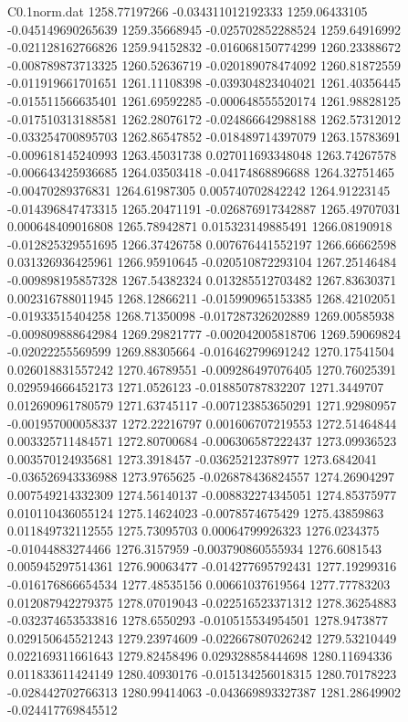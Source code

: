 \begin{filecontents}{C0.1norm.dat}
1258.77197266		-0.034311012192333
1259.06433105		-0.045149690265639
1259.35668945		-0.025702852288524
1259.64916992		-0.021128162766826
1259.94152832		-0.016068150774299
1260.23388672		-0.008789873713325
1260.52636719		-0.020189078474092
1260.81872559		-0.011919661701651
1261.11108398		-0.039304823404021
1261.40356445		-0.015511566635401
1261.69592285		-0.000648555520174
1261.98828125		-0.017510313188581
1262.28076172		-0.024866642988188
1262.57312012		-0.033254700895703
1262.86547852		-0.018489714397079
1263.15783691		-0.009618145240993
1263.45031738		0.027011693348048
1263.74267578		-0.006643425936685
1264.03503418		-0.04174868896688
1264.32751465		-0.00470289376831
1264.61987305		0.005740702842242
1264.91223145		-0.014396847473315
1265.20471191		-0.026876917342887
1265.49707031		0.000648409016808
1265.78942871		0.015323149885491
1266.08190918		-0.012825329551695
1266.37426758		0.007676441552197
1266.66662598		0.031326936425961
1266.95910645		-0.020510872293104
1267.25146484		-0.009898195857328
1267.54382324		0.013285512703482
1267.83630371		0.002316788011945
1268.12866211		-0.015990965153385
1268.42102051		-0.01933515404258
1268.71350098		-0.017287326202889
1269.00585938		-0.009809888642984
1269.29821777		-0.002042005818706
1269.59069824		-0.02022255569599
1269.88305664		-0.016462799691242
1270.17541504		0.026018831557242
1270.46789551		-0.009286497076405
1270.76025391		0.029594666452173
1271.0526123		-0.018850787832207
1271.3449707		0.012690961780579
1271.63745117		-0.007123853650291
1271.92980957		-0.001957000058337
1272.22216797		0.001606707219553
1272.51464844		0.003325711484571
1272.80700684		-0.006306587222437
1273.09936523		0.003570124935681
1273.3918457		-0.03625212378977
1273.6842041		-0.036526943336988
1273.9765625		-0.026878436824557
1274.26904297		0.007549214332309
1274.56140137		-0.008832274345051
1274.85375977		0.010110436055124
1275.14624023		-0.0078574675429
1275.43859863		0.011849732112555
1275.73095703		0.00064799926323
1276.0234375		-0.01044883274466
1276.3157959		-0.003790860555934
1276.6081543		0.005945297514361
1276.90063477		-0.014277695792431
1277.19299316		-0.016176866654534
1277.48535156		0.00661037619564
1277.77783203		0.012087942279375
1278.07019043		-0.022516523371312
1278.36254883		-0.032374653533816
1278.6550293		-0.010515534954501
1278.9473877		0.029150645521243
1279.23974609		-0.022667807026242
1279.53210449		0.022169311661643
1279.82458496		0.029328858444698
1280.11694336		0.011833611424149
1280.40930176		-0.015134256018315
1280.70178223		-0.028442702766313
1280.99414063		-0.043669893327387
1281.28649902		-0.024417769845512

\end{filecontents}
